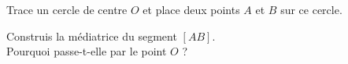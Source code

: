 \begin{myenumerate}
\item Trace un cercle de centre $O$ et place deux points $A$ et $B$ sur ce cercle.
\item Construis la médiatrice du segment $[AB]$.\\Pourquoi passe-t-elle par le point $O$ ?
\end{myenumerate}
